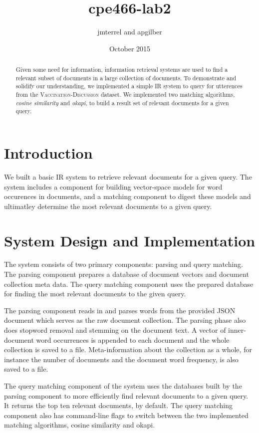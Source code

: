 \documentclass{article}
\title{cpe466-lab2}
\author{jmterrel and apgilber}
\date{October 2015}
\begin{document}
\maketitle

\begin{abstract}
Given some need for information, information retrieval systems are
used to find a relevant subset of documents in a large collection of
documents. To demonstrate and solidify our understanding, we
implemented a simple IR system to query for utterences from the
\textsc{Vaccination-Discussion} dataset. We implemented two matching
algorithms, \textit{cosine similarity} and \textit{okapi}, to build a
result set of relevant documents for a given query.
\end{abstract}

\section{Introduction}
We built a basic IR system to retrieve relevant documents for a given query. The system includes a component for building vector-space models for word occurences in documents, and a matching component to digest these models and ultimatley determine the most relevant documents to a given query.

\section{System Design and Implementation}
The system consists of two primary components: parsing and query matching. The parsing component prepares a database of document vectors and document collection meta data. The query matching component uses the prepared database for finding the most relevant documents to the given query.

The parsing component reads in and parses words from the provided JSON
document which serves as the raw document collection. The parsing
phase also does stopword removal and stemming on the document text. A
vector of inner-document word occurrences is appended to each document
and the whole collection is saved to a file. Meta-information
about the collection as a whole, for instance the number of documents
and the document word frequency, is also saved to a file.

The query matching component of the system uses the databases built by the parsing component to more efficiently find relevant documents to a given query. It returns the top ten relevant documents, by default. The query matching component also has command-line flags to switch between the two implemented matching algorithms, cosine similarity and okapi.
\end{document}
